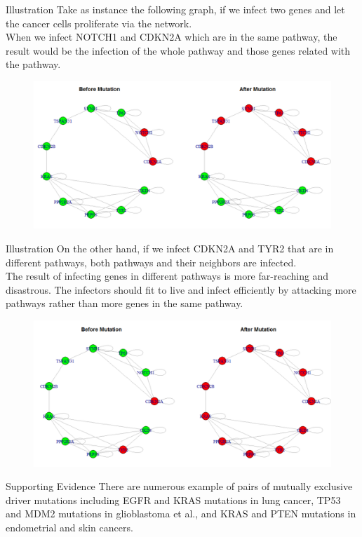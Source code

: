 \documentclass[xcolor=dvipsnames]{beamer}
\begin{document}
\begin{frame}{Illustration}
Take as instance the following graph, if we infect two genes and let the cancer cells proliferate via the network.\\
When we infect NOTCH1 and CDKN2A which are in the same pathway, the result would be the infection of the whole pathway and those genes related with the pathway.\\
\begin{figure}
\includegraphics[width=0.9\linewidth]{BeforeMutation1.png}
\end{figure}
\end{frame}
\begin{frame}{Illustration}
On the other hand, if we infect CDKN2A and TYR2 that are in different pathways, both pathways and their neighbors are infected.\\
The result of infecting genes in different pathways is more far-reaching and disastrous. The infectors should fit to live and infect efficiently by attacking more pathways rather than more genes in the same pathway.
\begin{figure}
\includegraphics[width=0.9\linewidth]{BeforeMutation2.png}
\end{figure}
\end{frame}
\begin{frame}{Supporting Evidence}
There are numerous example of pairs of mutually exclusive driver mutations including EGFR and KRAS mutations in lung cancer, TP53 and MDM2 mutations in glioblastoma et al., and KRAS and PTEN mutations in endometrial and skin cancers.
\end{frame}
\end{document}
